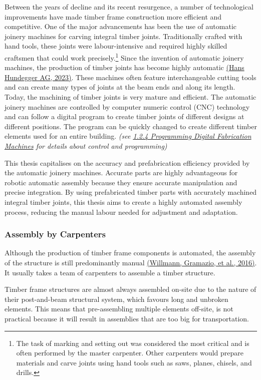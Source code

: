 \documentclass[11pt]{book}
\begin{document}
Between the years of decline and its recent resurgence, a number of technological improvements have made timber frame construction more efficient and competitive. One of the major advancements has been the use of automatic joinery machines for carving integral timber joints. Traditionally crafted with hand tools, these joints were labour-intensive and required highly skilled craftsmen that could work precisely.\footnote{ The task of marking and setting out was considered the most critical and is often performed by the master carpenter. Other carpenters would prepare materials and carve joints using hand tools such as saws, planes, chisels, and drills.}\textit{ }Since the invention of automatic joinery machines, the production of timber joints has become highly automatic \href{https://www.zotero.org/google-docs/?1lvKCf}{(Hans Hundegger AG, 2023)}. These machines often feature interchangeable cutting tools and can create many types of joints at the beam ends and along its length. Today, the machining of timber joints is very mature and efficient. The automatic joinery machines are controlled by computer numeric control (CNC) technology and can follow a digital program to create timber joints of different designs at different positions. The program can be quickly changed to create different timber elements used for an entire building. \textit{(see \underline{1.2.4 Programming Digital Fabrication Machines} for details about control and programming)}

This thesis capitalises on the accuracy and prefabrication efficiency provided by the automatic joinery machines. Accurate parts are highly advantageous for robotic automatic assembly because they ensure accurate manipulation and precise integration. By using prefabricated timber parts with accurately machined integral timber joints, this thesis aims to create a highly automated assembly process, reducing the manual labour needed for adjustment and adaptation. 

\subsubsection{Assembly by Carpenters}

Although the production of timber frame components is automated, the assembly of the structure is still predominantly manual \href{https://www.zotero.org/google-docs/?mMONEv}{(Willmann, Gramazio, et al., 2016)}. It usually takes a team of carpenters to assemble a timber structure.

Timber frame structures are almost always assembled on-site due to the nature of their post-and-beam structural system, which favours long and unbroken elements. This means that pre-assembling multiple elements off-site, is not practical because it will result in assemblies that are too big for transportation. 
\end{document}
